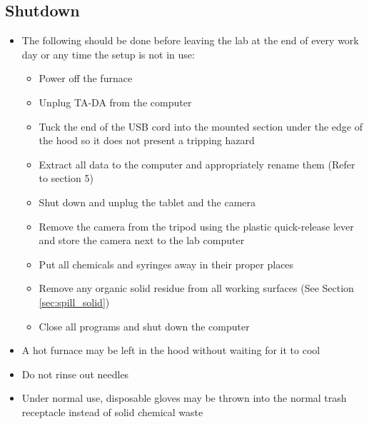 \documentclass[letterpaper,11pt]{article}
\begin{document}
    \subsection{Shutdown}
    \begin{itemize}
    \item The following should be done before leaving the lab at the end of 
        every work day or any time the setup is not in use:
        \begin{itemize}
        \item Power off the furnace
        \item Unplug TA-DA from the computer 
        \item Tuck the end of the USB cord into the mounted section under the 
            edge of the hood so it does not present a tripping hazard
        \item Extract all data to the computer and appropriately rename them (Refer to section 5)
        \item Shut down and unplug the tablet and the camera
        \item Remove the camera from the tripod using the plastic quick-release 
            lever and store the camera next to the lab computer
        \item Put all chemicals and syringes away in their proper places
        \item Remove any organic solid residue from all working surfaces 
            (See Section \ref{sec:spill_solid})
        \item Close all programs and shut down the computer
        \end{itemize}
    
    \item A hot furnace may be left in the hood without waiting for it to cool
    \item Do not rinse out needles %
    \item Under normal use, disposable gloves may be thrown into the normal 
        trash receptacle instead of solid chemical waste
    \end{itemize}
    
\end{document}
